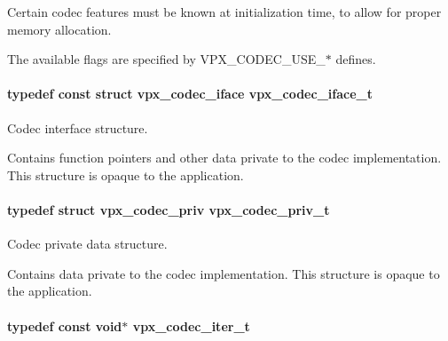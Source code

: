 Certain codec features must be known at initialization time, to allow for proper memory allocation.

The available flags are specified by V\+P\+X\+\_\+\+C\+O\+D\+E\+C\+\_\+\+U\+S\+E\+\_\+$\ast$ defines. 
\paragraph[{\texorpdfstring{vpx\+\_\+codec\+\_\+iface\+\_\+t}{vpx_codec_iface_t}}]{\setlength{\rightskip}{0pt plus 5cm}typedef const struct vpx\+\_\+codec\+\_\+iface {\bf vpx\+\_\+codec\+\_\+iface\+\_\+t}}\hypertarget{group__codec_gae99c3b04f4a567a311211cce3ae6b83b}{}\label{group__codec_gae99c3b04f4a567a311211cce3ae6b83b}


Codec interface structure. 

Contains function pointers and other data private to the codec implementation. This structure is opaque to the application. 
\paragraph[{\texorpdfstring{vpx\+\_\+codec\+\_\+priv\+\_\+t}{vpx_codec_priv_t}}]{\setlength{\rightskip}{0pt plus 5cm}typedef struct vpx\+\_\+codec\+\_\+priv {\bf vpx\+\_\+codec\+\_\+priv\+\_\+t}}\hypertarget{group__codec_ga1e262f91be9141a7176335fd409397ab}{}\label{group__codec_ga1e262f91be9141a7176335fd409397ab}


Codec private data structure. 

Contains data private to the codec implementation. This structure is opaque to the application. 
\paragraph[{\texorpdfstring{vpx\+\_\+codec\+\_\+iter\+\_\+t}{vpx_codec_iter_t}}]{\setlength{\rightskip}{0pt plus 5cm}typedef const void$\ast$ {\bf vpx\+\_\+codec\+\_\+iter\+\_\+t}}\hypertarget{group__codec_ga6ea348f76b1f8a1fe50e14db684146c6}{}\label{group__codec_ga6ea348f76b1f8a1fe50e14db684146c6}


